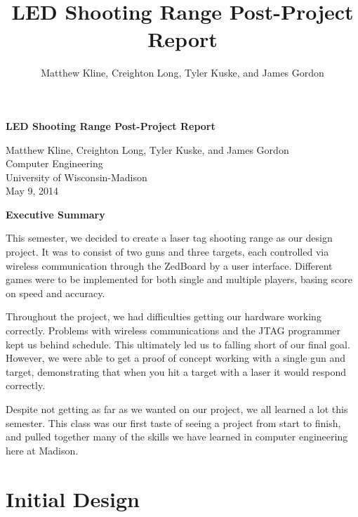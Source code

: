 \documentclass[oneside]{book}
\begin{document}
\title{LED Shooting Range Post-Project Report}
\author{Matthew Kline, Creighton Long, Tyler Kuske, and James Gordon}
\begin{titlepage}
\vspace*{\fill}
\begin{Large}
\begin{center}
\textbf{LED Shooting Range Post-Project Report}

Matthew Kline, Creighton Long, Tyler Kuske, and James Gordon \\
Computer Engineering \\
University of Wisconsin-Madison \\
May 9, 2014
\end{center}
\end{Large}
\vspace*{\fill}
\end{titlepage}
\frontmatter
\begin{Large}
\begin{center}
\textbf{Executive Summary}
\end{center}
\end{Large}

This semester, we decided to create a laser tag shooting range as our design project.
It was to consist of two guns and three targets,
each controlled via wireless communication through the ZedBoard by a user interface.
Different games were to be implemented for both single and multiple players,
basing score on speed and accuracy.

Throughout the project, we had difficulties getting our hardware working correctly.
Problems with wireless communications and the JTAG programmer kept us behind schedule.
This ultimately led us to falling short of our final goal.
However, we were able to get a proof of concept working with a single gun and target,
demonstrating that when you hit a target with a laser it would respond correctly.

Despite not getting as far as we wanted on our project, we all learned a lot this semester.
This class was our first taste of seeing a project from start to finish,
and pulled together many of the skills we have learned in computer engineering here
at Madison.

\newpage
\tableofcontents
\newpage
{}
\mainmatter

\section{Initial Design}
\end{document}
